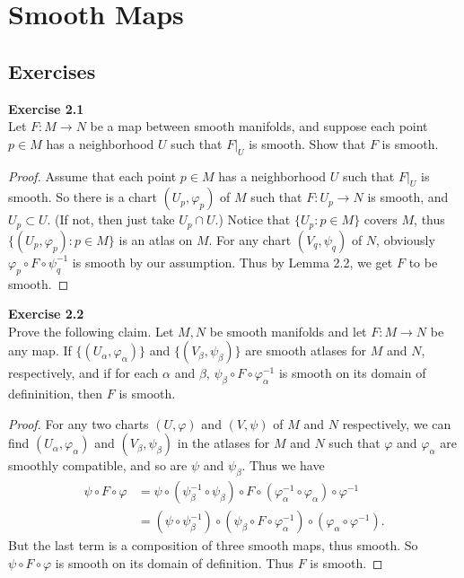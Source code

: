 \documentclass[12pt, a4paper]{article}
\theoremstyle{plain}
\def\phi{\varphi}
\newenvironment{exercise}[2][Exercise]
    { \begin{mdframed}[backgroundcolor=gray!20] \textbf{#1 #2} \\}
    {  \end{mdframed}}
\begin{document}
\section{Smooth Maps}

\subsection{Exercises}


\begin{exercise}{2.1}
    Let $F\colon M\to N$ be a map between smooth manifolds, and suppose each point $p\in M$ has a neighborhood $U$ such that $F|_U$ is smooth. Show that $F$ is smooth.
\end{exercise}
    \begin{proof}
        Assume that each point $p\in M$ has a neighborhood $U$ such that $F|_U$ is smooth. So there is a chart $(U_p,\phi_p)$ of $M$ such that $F\colon U_p\to N$ is smooth, and $U_p\subset U$. (If not, then just take $U_p\cap U$.) Notice that $\{U_p:p\in M\}$ covers $M$, thus $\{(U_p,\phi_p):p\in M\}$ is an atlas on $M$. For any chart $(V_q,\psi_q)$ of $N$, obviously $\phi_p\circ F\circ \psi_q^{-1}$ is smooth by our assumption. Thus by Lemma 2.2, we get $F$ to be smooth.
    \end{proof}


\begin{exercise}{2.2}
    Prove the following claim. Let $M,N$ be smooth manifolds and let $F\colon M\to N$ be any map. If $\{(U_\alpha,\phi_\alpha)\}$ and $\{(V_\beta,\psi_\beta)\}$ are smooth atlases for $M$ and $N$, respectively, and if for each $\alpha$ and $\beta$, $\psi_\beta\circ F\circ \phi^{-1}_\alpha$ is smooth on its domain of defininition, then $F$ is smooth.
\end{exercise} 
    \begin{proof}
        For any two charts $(U,\phi)$ and $(V,\psi)$ of $M$ and $N$ respectively, we can find $(U_\alpha,\phi_\alpha)$ and $(V_\beta,\psi_\beta)$ in the atlases for $M$ and $N$ such that $\phi$ and $\phi_\alpha$ are smoothly compatible, and so are $\psi$ and $\psi_\beta$. Thus we have
        \begin{align*}
        \psi\circ F\circ\phi &= \psi\circ (\psi_\beta^{-1}\circ \psi_\beta)\circ F\circ (\phi_\alpha^{-1}\circ \phi_\alpha)\circ \phi^{-1}\\
        &=(\psi\circ \psi_\beta^{-1})\circ (\psi_\beta\circ F\circ \phi_\alpha^{-1})\circ (\phi_\alpha\circ \phi^{-1}).
        \end{align*}
        But the last term is a composition of three smooth maps, thus smooth. So $\psi\circ F\circ \phi$ is smooth on its domain of definition. Thus $F$ is smooth.
    \end{proof}
\end{document}

